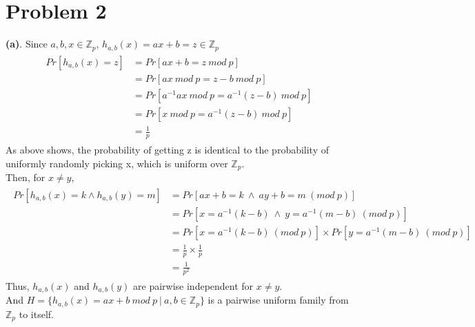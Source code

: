 \documentclass[titlepage, paper=a4, fontsize=11pt]{scrartcl} %
\numberwithin{equation}{section} %
\numberwithin{figure}{section} %
\numberwithin{table}{section} %
\begin{document}

\section*{Problem 2}
\textbf{(a)}. Since $a, b, x \in \mathbb{Z}_p$, $h_{a,b}(x) = ax+b = z \in \mathbb{Z}_p$
\begin{align*} 
\begin{split}
Pr[h_{a,b}(x) = z] &= Pr[ax+b = z \ mod \ p] \\
&= Pr[ax \ mod \ p = z-b \ mod \ p] \\
&= Pr[a^{-1}ax \ mod \ p = a^{-1}(z-b) \ mod \ p] \\
&= Pr[x \ mod \ p = a^{-1}(z-b) \ mod \ p] \\
&= \frac{1}{p}
\end{split}					
\end{align*}
As above shows, the probability of getting z is identical to the probability of uniformly randomly picking x, which is uniform over $\mathbb{Z}_p$. \\
Then, for $x \neq y$,
\begin{align*} 
\begin{split}
Pr[h_{a,b}(x) = k \land h_{a,b}(y) = m] &= Pr[ax+b=k \ \land \ ay+b=m \  (mod\ p)] \\
&= Pr[x=a^{-1}(k-b) \ \land \ y=a^{-1}(m-b) \  (mod\ p)] \\
&= Pr[x=a^{-1}(k-b) \  (mod\ p)] \times Pr[y=a^{-1}(m-b) \ (mod\ p)] \\
&= \frac{1}{p} \times \frac{1}{p} \\
&= \frac{1}{p^2}
\end{split}					
\end{align*}
Thus, $h_{a,b}(x)$ and $h_{a,b}(y)$ are pairwise independent for $x \neq y$. \\
And $H=\{ h_{a,b}(x)=ax+b \ mod\ p\ |\ a,b \in \mathbb{Z}_p \}$ is a pairwise uniform family from $\mathbb{Z}_p$ to itself. \\
\end{document}
